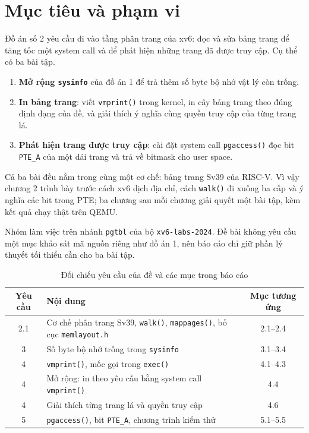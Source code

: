 \chapter{Mục tiêu và phạm vi}

\newpage

Đồ án số 2 yêu cầu đi vào tầng phân trang của xv6: đọc và sửa bảng trang để tăng tốc một system call và để phát hiện những trang đã được truy cập. Cụ thể có ba bài tập.

\begin{enumerate}[itemsep=2.5pt, topsep=2.5pt, leftmargin=1.5cm]
    \item \textbf{Mở rộng \texttt{sysinfo}} của đồ án 1 để trả thêm số byte bộ nhớ vật lý còn trống.
    \item \textbf{In bảng trang}: viết \texttt{vmprint()} trong kernel, in cây bảng trang theo đúng định dạng của đề, và giải thích ý nghĩa cùng quyền truy cập của từng trang lá.
    \item \textbf{Phát hiện trang được truy cập}: cài đặt system call \texttt{pgaccess()} đọc bit \texttt{PTE\_A} của một dải trang và trả về bitmask cho user space.
\end{enumerate}

Cả ba bài đều nằm trong cùng một cơ chế: bảng trang Sv39 của RISC-V. Vì vậy chương 2 trình bày trước cách xv6 dịch địa chỉ, cách \texttt{walk()} đi xuống ba cấp và ý nghĩa các bit trong PTE; ba chương sau mỗi chương giải quyết một bài tập, kèm kết quả chạy thật trên QEMU.

Nhóm làm việc trên nhánh \texttt{pgtbl} của bộ \texttt{xv6-labs-2024}. Đề bài không yêu cầu một mục khảo sát mã nguồn riêng như đồ án 1, nên báo cáo chỉ giữ phần lý thuyết tối thiểu cần cho ba bài tập.

\vspace{0.5cm}

\begin{table}[H]
\centering
\renewcommand{\arraystretch}{1.3}
\setlength{\tabcolsep}{8pt}
\begin{tabular}{|c|p{9cm}|c|}
\hline
\rowcolor[rgb]{0.8, 0.9, 1.0}
\textbf{Yêu cầu} & \textbf{Nội dung} & \textbf{Mục tương ứng} \\ \hline
2.1 & Cơ chế phân trang Sv39, \texttt{walk()}, \texttt{mappages()}, bố cục \texttt{memlayout.h} & 2.1--2.4 \\ \hline
3 & Số byte bộ nhớ trống trong \texttt{sysinfo} & 3.1--3.4 \\ \hline
4 & \texttt{vmprint()}, mốc gọi trong \texttt{exec()} & 4.1--4.3 \\ \hline
4 & Mở rộng: in theo yêu cầu bằng system call \texttt{vmprint()} & 4.4 \\ \hline
4 & Giải thích từng trang lá và quyền truy cập & 4.6 \\ \hline
5 & \texttt{pgaccess()}, bit \texttt{PTE\_A}, chương trình kiểm thử & 5.1--5.5 \\ \hline
\end{tabular}
\caption{Đối chiếu yêu cầu của đề và các mục trong báo cáo}
\end{table}
